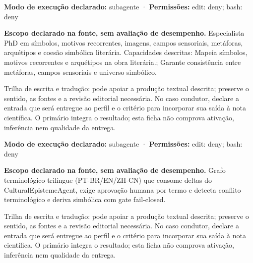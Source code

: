 \begin{arquitetura}
\textbf{Modo de execução declarado:} subagente · \textbf{Permissões:} edit: deny; bash: deny
\end{arquitetura}


\begin{descricao}
\textbf{Escopo declarado na fonte, sem avaliação de desempenho.}
Especialista PhD em símbolos, motivos recorrentes, imagens, campos sensoriais, metáforas, arquétipos e coesão simbólica literária. Capacidades descritas: Mapeia símbolos, motivos recorrentes e arquétipos na obra literária.; Garante consistência entre metáforas, campos sensoriais e universo simbólico.
\end{descricao}

\begin{funcao}
Trilha de escrita e tradução: pode apoiar a produção textual descrita; preserve o sentido, as fontes e a revisão editorial necessária. No caso condutor, declare a entrada que será entregue ao perfil e o critério para incorporar sua saída à nota científica. O primário integra o resultado; esta ficha não comprova ativação, inferência nem qualidade da entrega.
\end{funcao}

\begin{arquitetura}
\textbf{Modo de execução declarado:} subagente · \textbf{Permissões:} edit: deny; bash: deny
\end{arquitetura}


\begin{descricao}
\textbf{Escopo declarado na fonte, sem avaliação de desempenho.}
Grafo terminológico trilíngue (PT-BR/EN/ZH-CN) que consome deltas do CulturalEpistemeAgent, exige aprovação humana por termo e detecta conflito terminológico e deriva simbólica com gate fail-closed.
\end{descricao}

\begin{funcao}
Trilha de escrita e tradução: pode apoiar a produção textual descrita; preserve o sentido, as fontes e a revisão editorial necessária. No caso condutor, declare a entrada que será entregue ao perfil e o critério para incorporar sua saída à nota científica. O primário integra o resultado; esta ficha não comprova ativação, inferência nem qualidade da entrega.
\end{funcao}

